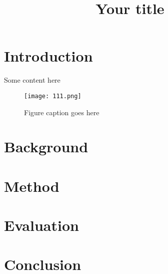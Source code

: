 \documentclass{article}
\title{Your title}
\begin{document}
\maketitle

\section{Introduction}

Some content here
\begin{figure}
	\texttt{[image: 111.png]}
	\caption{Figure caption goes here}
\end{figure}

\section{Background}

\section{Method}

\section{Evaluation}

\section{Conclusion}
\end{document}
